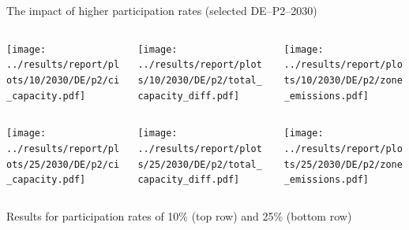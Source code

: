 \begin{frame}{The impact of higher participation rates (selected DE--P2--2030)}

  {\footnotesize

  \begin{columns}
  \begin{column}{5cm}
  \centering
  \texttt{[image: ../results/report/plots/10/2030/DE/p2/ci\_capacity.pdf]}
  \end{column}

  \begin{column}{5cm}
  \centering
  \texttt{[image: ../results/report/plots/10/2030/DE/p2/total\_capacity\_diff.pdf]}
  \end{column}

  \begin{column}{5cm}
  \centering
  \texttt{[image: ../results/report/plots/10/2030/DE/p2/zone\_emissions.pdf]}
  \end{column}

  \end{columns}

  \begin{columns}
    \begin{column}{5cm}
    \centering
    \texttt{[image: ../results/report/plots/25/2030/DE/p2/ci\_capacity.pdf]}
    \end{column}
  
    \begin{column}{5cm}
    \centering
    \texttt{[image: ../results/report/plots/25/2030/DE/p2/total\_capacity\_diff.pdf]}
    \end{column}
  
    \begin{column}{5cm}
    \centering
    \texttt{[image: ../results/report/plots/25/2030/DE/p2/zone\_emissions.pdf]}
    \end{column}

  \end{columns}

  \begin{columns}
    \begin{column}{15cm}
    {\scriptsize
    Results for participation rates of 10\% (top row) and 25\% (bottom row)
    }
    \end{column}
    \end{columns}
  }

\end{frame}



